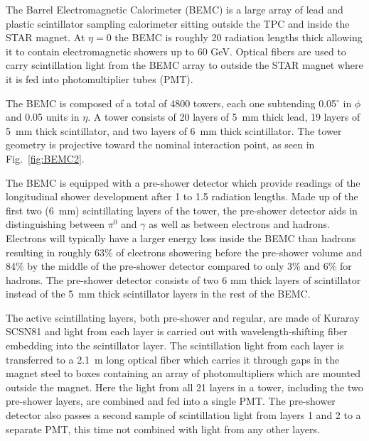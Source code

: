 \documentclass[letterpaper, abstract = on,listof=totoc, bibliography=totoc]{scrreprt}
\begin{document}
The Barrel Electromagnetic Calorimeter (BEMC) is a large array of lead and plastic scintillator sampling calorimeter sitting outside the TPC and inside the STAR magnet. At $\eta = 0$ the BEMC is roughly 20 radiation lengths thick allowing it to contain electromagnetic showers up to 60 GeV. Optical fibers are used to carry scintillation light from the BEMC array to outside the STAR magnet where it is fed into photomultiplier tubes (PMT).

The BEMC is composed of a total of 4800 towers, each one subtending 0.05$^\circ$ in $\phi$ and 0.05 units in $\eta$. A tower consists of 20 layers of 5~mm thick lead, 19 layers of 5~mm thick scintillator, and two layers of 6~mm thick scintillator. The tower geometry is projective toward the nominal interaction point, as seen in Fig.~\ref{fig:BEMC2}.  

The BEMC is equipped with a pre-shower detector which provide readings of the longitudinal shower development after 1 to 1.5 radiation lengths. Made up of the first two (6~mm) scintillating layers of the tower, the pre-shower detector aids in distinguishing between $\pi^0$ and $\gamma$ as well as between electrons and hadrons. Electrons will typically have a larger energy loss inside the BEMC than hadrons resulting in roughly 63\% of electrons showering before the pre-shower volume and 84\% by the middle of the pre-shower detector compared to only 3\% and 6\% for hadrons. The pre-shower detector consists of two 6 mm thick layers of scintillator instead of the 5~mm thick scintillator layers in the rest of the BEMC. 

The active scintillating layers, both pre-shower and regular, are made of Kuraray SCSN81 and light from each layer is carried out with wavelength-shifting fiber embedding into the scintillator layer. The scintillation light from each layer is transferred to a 2.1~m long optical fiber which carries it through gaps in the magnet steel to boxes containing an array of photomultipliers which are mounted outside the magnet. Here the light from all 21 layers in a tower, including the two pre-shower layers, are combined and fed into a single PMT. The pre-shower detector also passes a second sample of scintillation light from layers 1 and 2 to a separate PMT, this time not combined with light from any other layers.  
\end{document}
